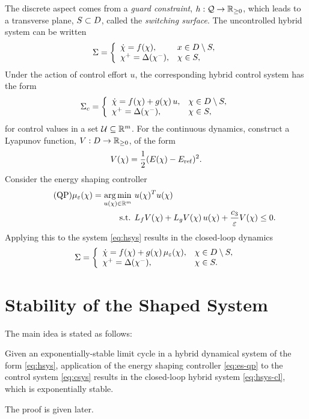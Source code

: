\documentclass[twocolumn]{article}
\begin{document}
The discrete aspect comes from a {\em guard constraint}, $h : \mathcal{Q} \to \mathbb{R}_{\geq 0}$, which leads to a transverse plane, $S \subset D$, called the {\em switching surface}.
%
The uncontrolled hybrid system can be written
\begin{align}
  \Sigma = \left\{
  \begin{array}{l l}
    {\dot {\chi}} = f(\chi), & x \in D \setminus S,\\
    \chi^{+} = \Delta(\chi^{-}), &\chi \in S,
  \end{array}\right.
  \label{eq:hsys}
\end{align}
Under the action of control effort $u$, the corresponding hybrid control system has the form
\begin{align}
  \Sigma_{c} = \left\{
  \begin{array}{l l}
    {\dot {\chi}} = f(\chi) + g(\chi) \, u, & \chi \in D \setminus S,\\
    \chi^{+} = \Delta(\chi^{-}), & \chi \in S,
  \end{array}\right.
  \label{eq:csys}
\end{align}
for control values in a set $\mathcal{U} \subseteq \mathbb{R}^{m}$.
%
For the continuous dynamics, construct a Lyapunov function, $V : D \to \mathbb{R}_{\geq 0}$, of the form
\begin{align}
  \label{eq:lyap}
  V(\chi) = \frac{1}{2} (E(\chi) - E_{\mathrm{ref}})^2.
\end{align}
Consider the energy shaping controller
\begin{align}
  \label{eq:es-qp} \tag {QP}
  \mu_{\varepsilon}(\chi) = \operatorname*{arg\,min}_{u(\chi) \in \mathbb{R}^{m}} \ & u(\chi)^T u(\chi)\\
  \nonumber
  \mbox{s.t. } & L_{f} V(\chi) + L_{g} V(\chi) \, u(\chi) + \frac{c_{3}}{\varepsilon} V(\chi) \leq 0.
\end{align}
Applying this to the system \eqref{eq:hsys} results in the closed-loop dynamics
\begin{align}
  \label{eq:hsys-cl}
  \Sigma = \left\{
  \begin{array}{l l}
    {\dot {\chi}} = f(\chi) + g(\chi) \, \mu_{\varepsilon}(\chi), & \chi \in D \setminus S,\\
    \chi^{+} = \Delta(\chi^{-}), &\chi \in S.
  \end{array}\right.
\end{align}

\section{Stability of the Shaped System}

The main idea is stated as follows:
%
\begin{theorem}
  Given an exponentially-stable limit cycle in a hybrid dynamical system of the form \eqref{eq:hsys}, application of the energy shaping controller \eqref{eq:es-qp} to the control system \eqref{eq:csys} results in the closed-loop hybrid system \eqref{eq:hsys-cl}, which is exponentially stable.
\end{theorem}
%
The proof is given later.
\end{document}
